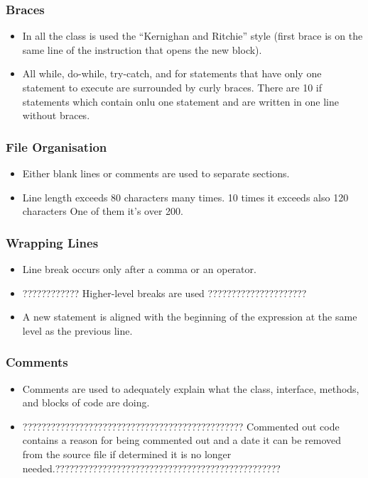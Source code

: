 \subsubsection{Braces}
\begin{itemize}
\item In all the class is used the “Kernighan and
Ritchie” style (first brace is on the same line of the instruction that
opens the new block).\\

\item All while, do-while, try-catch, and for statements that have
only one statement to execute are surrounded by curly braces. There are 10 if statements which contain onlu one statement and are written in one line without braces.\\

\end{itemize}

\subsubsection{File Organisation}
\begin{itemize}
\item Either blank lines or comments are used to separate sections.\\
\item Line length exceeds 80 characters many times. 10 times it exceeds also 120 characters One of them it's over 200.\\ 
\end{itemize}

\subsubsection{Wrapping Lines}
\begin{itemize}
\item Line break occurs only after a comma or an operator. \\
\item ???????????? Higher-level breaks are used ????????????????????? \\
\item A new statement is aligned with the beginning of the expression at the
same level as the previous line.\\
\end{itemize}


\subsubsection{Comments}
\begin{itemize}
\item Comments are used to adequately explain what the class, interface,
methods, and blocks of code are doing. \\
\item ??????????????????????????????????????????????? Commented out code contains a reason for being commented out and
a date it can be removed from the source file if determined it is no
longer needed.????????????????????????????????????????????????
\end{itemize}





